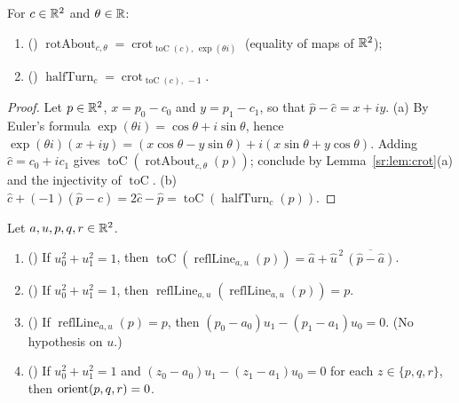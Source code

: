 \begin{lemma}\label{sr:lem:rot-half}
For $c\in\mathbb R^2$ and $\theta\in\mathbb R$:
\begin{enumerate}[label=(\alph*)]
\item () $\operatorname{rotAbout}_{c,\theta}=\operatorname{crot}_{\operatorname{toC}(c),\,\exp(\theta i)}$ (equality of maps
  of $\mathbb R^2$);
\item () $\operatorname{halfTurn}_c=\operatorname{crot}_{\operatorname{toC}(c),\,-1}$.
\end{enumerate}
\end{lemma}

\begin{proof}
Let $p\in\mathbb R^2$, $x=p_0-c_0$ and $y=p_1-c_1$, so that $\hat p-\hat c=x+iy$. (a) By Euler's formula
$\exp(\theta i)=\cos\theta+i\sin\theta$, hence $\exp(\theta i)(x+iy)=(x\cos\theta-y\sin\theta)+i(x\sin\theta+y\cos\theta)$.
Adding $\hat c=c_0+ic_1$ gives $\operatorname{toC}(\operatorname{rotAbout}_{c,\theta}(p))$; conclude by
Lemma~\ref{sr:lem:crot}(a) and the injectivity of $\operatorname{toC}$. (b) $\hat c+(-1)(\hat p-\hat c)=2\hat c-\hat p=
\operatorname{toC}(\operatorname{halfTurn}_c(p))$.
\end{proof}

\begin{lemma}\label{sr:lem:refl}
Let $a,u,p,q,r\in\mathbb R^2$.
\begin{enumerate}[label=(\alph*)]
\item () If $u_0^2+u_1^2=1$, then $\operatorname{toC}(\operatorname{reflLine}_{a,u}(p))=\hat a+\hat u^{\,2}\,
  \overline{(\hat p-\hat a)}$.
\item () If $u_0^2+u_1^2=1$, then
  $\operatorname{reflLine}_{a,u}(\operatorname{reflLine}_{a,u}(p))=p$.
\item () If $\operatorname{reflLine}_{a,u}(p)=p$, then $(p_0-a_0)u_1-(p_1-a_1)u_0=0$.
  (No hypothesis on $u$.)
\item () If $u_0^2+u_1^2=1$ and $(z_0-a_0)u_1-(z_1-a_1)u_0=0$ for each
  $z\in\{p,q,r\}$, then $\operatorname{orient}(p,q,r)=0$.
\end{enumerate}
\end{lemma}

